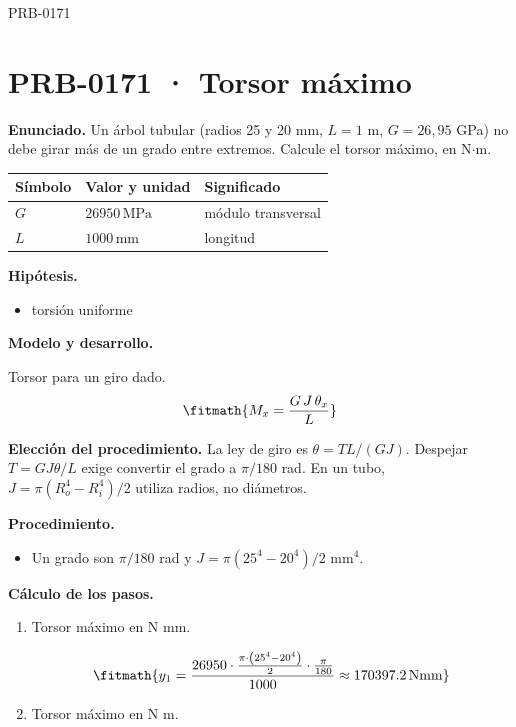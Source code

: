 \begin{studiumworked}{PRB-0171}

\section{PRB-0171 · Torsor máximo}

\textbf{Enunciado.} Un árbol tubular (radios 25 y 20 mm, $L = 1$ m, $G = 26{,}95$ GPa) no debe girar más de un grado entre extremos. Calcule el torsor máximo, en N$\cdot$m.

\par\medskip\noindent\begin{tabular}{@{}p{.18\linewidth}p{.26\linewidth}p{.48\linewidth}@{}}
\toprule Símbolo & Valor y unidad & Significado\\\midrule
$G$ & $26950\,\mathrm{MPa}$ & módulo transversal\\
$L$ & $1000\,\mathrm{mm}$ & longitud\\
\bottomrule\end{tabular}\par\medskip

\textbf{Hipótesis.}\begin{itemize}\item torsión uniforme\end{itemize}

\textbf{Modelo y desarrollo.}

Torsor para un giro dado.\[\fitmath{M_x = \frac{G\,J\,\theta_x}{L}}\]

\textbf{Elección del procedimiento.} La ley de giro es $\theta=TL/(GJ)$. Despejar $T=GJ\theta/L$ exige convertir el grado a $\pi/180$ rad. En un tubo, $J=\pi(R_o^4-R_i^4)/2$ utiliza radios, no diámetros.

\textbf{Procedimiento.}\begin{itemize}\item Un grado son $\pi/180$ rad y $J = \pi(25^4 - 20^4)/2$ mm$^4$.\end{itemize}

\textbf{Cálculo de los pasos.}

\begin{enumerate}

\item Torsor máximo en N mm.

\[\fitmath{y_{1}=\frac{26950\cdot \frac{\pi\cdot \left({25}^{4}-{20}^{4}\right)}{2}\cdot \frac{\pi}{180}}{1000}\approx 170397.2\,\mathrm{N mm}}\]

\item Torsor máximo en N m.


\end{enumerate}
\end{studiumworked}
